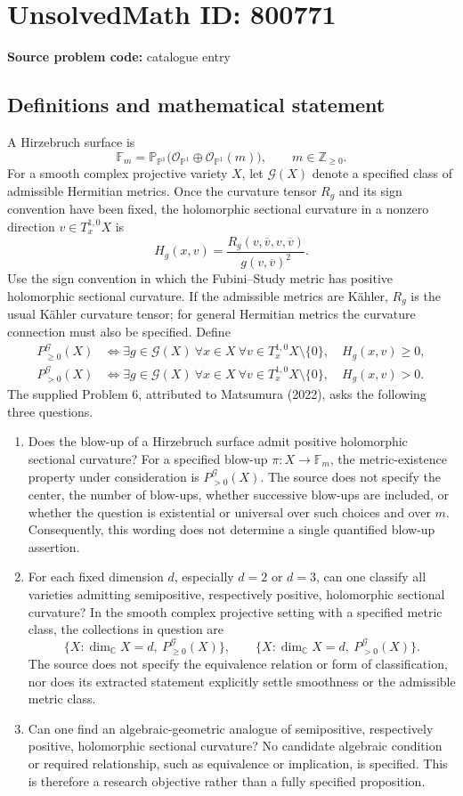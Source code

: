 \documentclass[11pt]{article}
\newcommand{\Z}{\mathbb{Z}}
\newcommand{\C}{\mathbb{C}}
\newcommand{\PP}{\mathbb{P}}
\begin{document}
\section*{UnsolvedMath ID: 800771}
\textbf{Source problem code:} catalogue entry
\subsection{Definitions and mathematical statement}
A Hirzebruch surface is
\[
\mathbb F_m=\PP_{\PP^1}\bigl(\mathcal O_{\PP^1}\oplus\mathcal O_{\PP^1}(m)\bigr),\qquad m\in\Z_{\geq 0}.
\]
For a smooth complex projective variety \(X\), let \(\mathcal G(X)\) denote a specified class of admissible Hermitian metrics. Once the curvature tensor \(R_g\) and its sign convention have been fixed, the holomorphic sectional curvature in a nonzero direction \(v\in T_x^{1,0}X\) is
\[
H_g(x,v)=\frac{R_g(v,\overline v,v,\overline v)}{g(v,\overline v)^2}.
\]
Use the sign convention in which the Fubini--Study metric has positive holomorphic sectional curvature. If the admissible metrics are K\"ahler, \(R_g\) is the usual K\"ahler curvature tensor; for general Hermitian metrics the curvature connection must also be specified. Define
\[
\begin{aligned}
P_{\geq0}^{\mathcal G}(X)&\Longleftrightarrow
\exists g\in\mathcal G(X)\ \forall x\in X\ \forall v\in T_x^{1,0}X\setminus\{0\},\quad H_g(x,v)\geq0,\\
P_{>0}^{\mathcal G}(X)&\Longleftrightarrow
\exists g\in\mathcal G(X)\ \forall x\in X\ \forall v\in T_x^{1,0}X\setminus\{0\},\quad H_g(x,v)>0.
\end{aligned}
\]
The supplied Problem 6, attributed to Matsumura (2022), asks the following three questions.
\begin{enumerate}
\item Does the blow-up of a Hirzebruch surface admit positive holomorphic sectional curvature? For a specified blow-up \(\pi:X\to\mathbb F_m\), the metric-existence property under consideration is \(P_{>0}^{\mathcal G}(X)\). The source does not specify the center, the number of blow-ups, whether successive blow-ups are included, or whether the question is existential or universal over such choices and over \(m\). Consequently, this wording does not determine a single quantified blow-up assertion.
\item For each fixed dimension \(d\), especially \(d=2\) or \(d=3\), can one classify all varieties admitting semipositive, respectively positive, holomorphic sectional curvature? In the smooth complex projective setting with a specified metric class, the collections in question are
\[
\{X:\dim_{\C}X=d,\ P_{\geq0}^{\mathcal G}(X)\},\qquad
\{X:\dim_{\C}X=d,\ P_{>0}^{\mathcal G}(X)\}.
\]
The source does not specify the equivalence relation or form of classification, nor does its extracted statement explicitly settle smoothness or the admissible metric class.
\item Can one find an algebraic-geometric analogue of semipositive, respectively positive, holomorphic sectional curvature? No candidate algebraic condition or required relationship, such as equivalence or implication, is specified. This is therefore a research objective rather than a fully specified proposition.
\end{enumerate}
\end{document}
